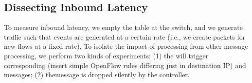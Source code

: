 \subsection{Dissecting Inbound Latency}
\label{s:measure_inbound}

\begin{figure}
{}
\label{fig:inbound-1}
\end{figure}

To measure inbound latency, we empty the table at the switch, and we generate
traffic such that \packetin events are generated at a certain rate (i.e., we
create packets for new flows at a fixed rate). To isolate the impact of
\packetin processing from other message processing, we perform two kinds of
experiments: (1) the \packetin will trigger corresponding \flowmod (insert
simple OpenFlow rules differing just in destination IP) and \packetout
messages; (2) the\linebreak \packetin message is dropped silently by the
controller. 

